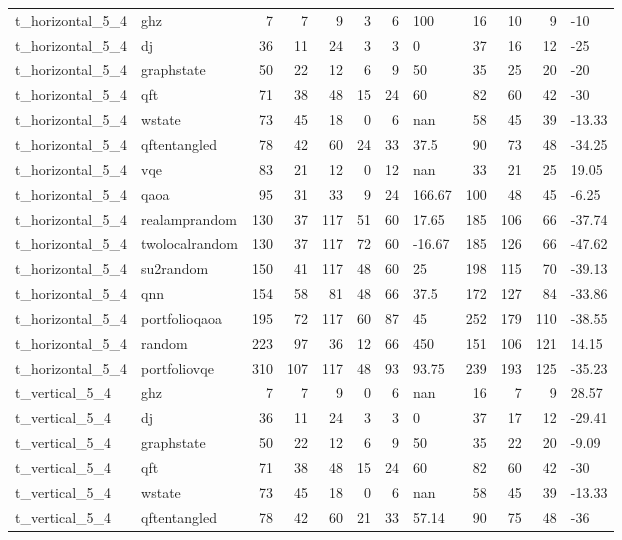 \begin{longtable}{llrrrrrlrrrl}
t\_horizontal\_5\_4 & ghz & 7 & 7 & 9 & 3 & 6 & 100 & 16 & 10 & 9 & -10 \\
t\_horizontal\_5\_4 & dj & 36 & 11 & 24 & 3 & 3 & 0 & 37 & 16 & 12 & -25 \\
t\_horizontal\_5\_4 & graphstate & 50 & 22 & 12 & 6 & 9 & 50 & 35 & 25 & 20 & -20 \\
t\_horizontal\_5\_4 & qft & 71 & 38 & 48 & 15 & 24 & 60 & 82 & 60 & 42 & -30 \\
t\_horizontal\_5\_4 & wstate & 73 & 45 & 18 & 0 & 6 & nan & 58 & 45 & 39 & -13.33 \\
t\_horizontal\_5\_4 & qftentangled & 78 & 42 & 60 & 24 & 33 & 37.5 & 90 & 73 & 48 & -34.25 \\
t\_horizontal\_5\_4 & vqe & 83 & 21 & 12 & 0 & 12 & nan & 33 & 21 & 25 & 19.05 \\
t\_horizontal\_5\_4 & qaoa & 95 & 31 & 33 & 9 & 24 & 166.67 & 100 & 48 & 45 & -6.25 \\
t\_horizontal\_5\_4 & realamprandom & 130 & 37 & 117 & 51 & 60 & 17.65 & 185 & 106 & 66 & -37.74 \\
t\_horizontal\_5\_4 & twolocalrandom & 130 & 37 & 117 & 72 & 60 & -16.67 & 185 & 126 & 66 & -47.62 \\
t\_horizontal\_5\_4 & su2random & 150 & 41 & 117 & 48 & 60 & 25 & 198 & 115 & 70 & -39.13 \\
t\_horizontal\_5\_4 & qnn & 154 & 58 & 81 & 48 & 66 & 37.5 & 172 & 127 & 84 & -33.86 \\
t\_horizontal\_5\_4 & portfolioqaoa & 195 & 72 & 117 & 60 & 87 & 45 & 252 & 179 & 110 & -38.55 \\
t\_horizontal\_5\_4 & random & 223 & 97 & 36 & 12 & 66 & 450 & 151 & 106 & 121 & 14.15 \\
t\_horizontal\_5\_4 & portfoliovqe & 310 & 107 & 117 & 48 & 93 & 93.75 & 239 & 193 & 125 & -35.23 \\
t\_vertical\_5\_4 & ghz & 7 & 7 & 9 & 0 & 6 & nan & 16 & 7 & 9 & 28.57 \\
t\_vertical\_5\_4 & dj & 36 & 11 & 24 & 3 & 3 & 0 & 37 & 17 & 12 & -29.41 \\
t\_vertical\_5\_4 & graphstate & 50 & 22 & 12 & 6 & 9 & 50 & 35 & 22 & 20 & -9.09 \\
t\_vertical\_5\_4 & qft & 71 & 38 & 48 & 15 & 24 & 60 & 82 & 60 & 42 & -30 \\
t\_vertical\_5\_4 & wstate & 73 & 45 & 18 & 0 & 6 & nan & 58 & 45 & 39 & -13.33 \\
t\_vertical\_5\_4 & qftentangled & 78 & 42 & 60 & 21 & 33 & 57.14 & 90 & 75 & 48 & -36 \\

\end{longtable}
